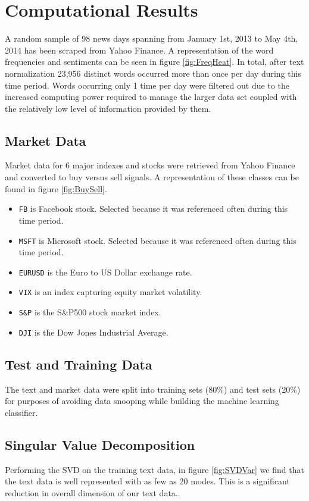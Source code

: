 \documentclass{article}
\begin{document}
\section{Computational Results}

A random sample of 98 news days spanning from January 1st, 2013 to May 4th, 2014 has been scraped from Yahoo Finance.  A representation of the word frequencies and sentiments can be seen in figure \ref{fig:FreqHeat}.  In total, after text normalization 23,956 distinct words occurred more than once per day during this time period.  Words occurring only 1 time per day were filtered out due to the increased computing power required to manage the larger data set coupled with the relatively low level of information provided by them.

\subsection{Market Data}
Market data for 6 major indexes and stocks were retrieved from Yahoo Finance and converted to buy versus sell signals.  A representation of these classes can be found in figure \ref{fig:BuySell}.

\begin{itemize}
	\item \texttt{FB} is Facebook stock.  Selected because it was referenced often during this time period.
	\item \texttt{MSFT} is Microsoft stock.  Selected because it was referenced often during this time period.
	\item \texttt{EURUSD} is the Euro to US Dollar exchange rate.
	\item \texttt{VIX} is an index capturing equity market volatility.
	\item \texttt{S\&P} is the S\&P500 stock market index.
	\item \texttt{DJI} is the Dow Jones Industrial Average.
\end{itemize}


\subsection{Test and Training Data}
The text and market data were split into training sets (80\%) and test sets (20\%) for purposes of avoiding data snooping while building the machine learning classifier.

\subsection{Singular Value Decomposition}
Performing the SVD on the training text data, in figure \ref{fig:SVDVar} we find that the text data is well represented with as few as 20 modes.  This is a significant reduction in overall dimension of our text data.. 
\end{document}
